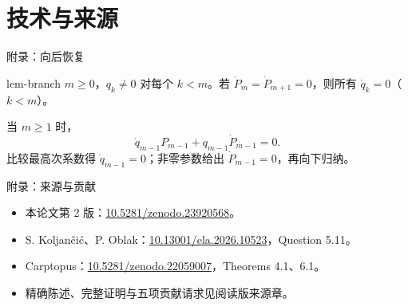 \documentclass{beamer}
\begin{document}
\appendix
\section{技术与来源}
\begin{frame}{附录：向后恢复}
\begin{bookresult}{lem-branch}
$m\geq0$，$q_k\ne0$ 对每个 $k<m$。若 $\dot P_m=\dot P_{m+1}=0$，则所有 $\dot q_k=0$（$k<m$）。
\end{bookresult}
当 $m\geq1$ 时，
\[\dot q_{m-1}P_{m-1}+q_{m-1}\dot P_{m-1}=0.\]
比较最高次系数得 $\dot q_{m-1}=0$；非零参数给出 $\dot P_{m-1}=0$，再向下归纳。
\end{frame}

\begin{frame}{附录：来源与贡献}
\small
\begin{itemize}
\item 本论文第 2 版：\href{https://doi.org/10.5281/zenodo.23920568}{10.5281/zenodo.23920568}。
\item S. Koljančić、P. Oblak：\href{https://doi.org/10.13001/ela.2026.10523}{10.13001/ela.2026.10523}，Question 5.11。
\item Carptopus：\href{https://doi.org/10.5281/zenodo.22059007}{10.5281/zenodo.22059007}，Theorems 4.1、6.1。
\item 精确陈述、完整证明与五项贡献请求见阅读版来源章。
\end{itemize}
\PinnedCommit
{}
\end{frame}

\FormalVerification
\end{document}
